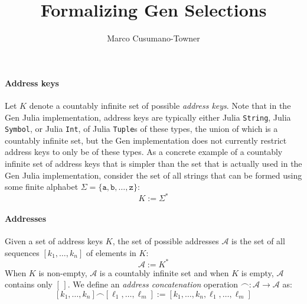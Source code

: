 \documentclass{article}
\title{Formalizing Gen Selections}
\author{Marco Cusumano-Towner}
\date{}
\begin{document}
\maketitle

\paragraph{Address keys}
Let $K$ denote a countably infinite set of possible \emph{address keys}.
Note that in the Gen Julia implementation, address keys are typically either Julia \texttt{String}, Julia \texttt{Symbol}, or Julia \texttt{Int}, of Julia \texttt{Tuple}s of these types, the union of which is a countably infinite set,
but the Gen implementation does not currently restrict address keys to only be of these types.
As a concrete example of a countably infinite set of address keys that is simpler than the set that is actually used in the Gen Julia implementation,
consider the set of all strings that can be formed using some finite alphabet $\Sigma = \{\mathtt{a}, \mathtt{b}, \ldots, \mathtt{z}\}$:
\[
    K := \Sigma^*
\]

\paragraph{Addresses}
Given a set of address keys $K$, the set of possible addresses $\mathcal{A}$ is the set of all sequences $[k_1, \ldots, k_n]$ of elements in $K$:
\[
    \mathcal{A} := K^*
\]
When $K$ is non-empty, $\mathcal{A}$ is a countably infinite set and when $K$ is empty, $\mathcal{A}$ contains only $[\,]$.
We define an \emph{address concatenation} operation $\frown : \mathcal{A} \to \mathcal{A}$ as:
\[
    [k_1, \ldots, k_n] \frown [\ell_1, \ldots, \ell_m] := [k_1, \ldots, k_n, \ell_1, \ldots, \ell_m]
\]
\end{document}
